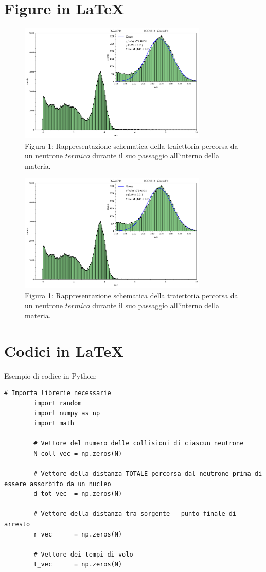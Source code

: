 \documentclass[preprint, twocolumn, 5p, lefttitle]{elsarticle} %
\begin{document}
\section{Figure in \LaTeX}
\begin{figure}[b]
\centering
\includegraphics[width=0.80\textwidth]{figure.pdf}
\caption{Figura 1: Rappresentazione schematica della traiettoria percorsa da un neutrone $termico$ durante il suo passaggio all'interno della materia.}
\label{fig:float}
\end{figure}
\begin{figure}[b]
\centering
\includegraphics[width=0.80\textwidth]{figure.pdf}
\caption{Figura 1: Rappresentazione schematica della traiettoria percorsa da un neutrone $termico$ durante il suo passaggio all'interno della materia.}
\label{fig:float}
\end{figure}


\section{Codici in \LaTeX}
Esempio di codice in Python:

\begin{lstlisting}[firstnumber = 54]
		# Importa librerie necessarie
		import random
		import numpy as np
		import math
		
		# Vettore del numero delle collisioni di ciascun neutrone 
		N_coll_vec = np.zeros(N)
	
		# Vettore della distanza TOTALE percorsa dal neutrone prima di essere assorbito da un nucleo 
		d_tot_vec  = np.zeros(N)
	
		# Vettore della distanza tra sorgente - punto finale di arresto
		r_vec      = np.zeros(N)
		
		# Vettore dei tempi di volo 
		t_vec      = np.zeros(N)
\end{lstlisting}
\end{document}
